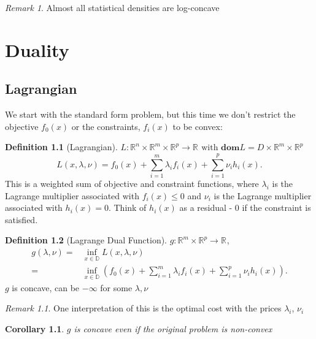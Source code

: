 \documentclass{report}
\newtheorem{corollary}{Corollary}[theorem]
\theoremstyle{remark} \newtheorem{remark}{Remark}[section]
\theoremstyle{definition}
\newtheorem{definition}{Definition}[section]
\theoremstyle{definition}
\theoremstyle{definition}
\theoremstyle{remark}
\begin{document}
\begin{remark}
    Almost all statistical densities are log-concave   
\end{remark}


\chapter{Duality}

\section{Lagrangian}
We start with the standard form problem, but this time we don't restrict the objective $f_0(x)$ or the constraints, $f_i(x)$ to be convex:
\begin{definition}[Lagrangian]
    $L: \mathbb{R}^{n} \times \mathbb{R}^{m} \times \mathbb{R}^{p} \to \mathbb{R}^{} \text{ with } \textbf{dom}L = D \times  \mathbb{R}^m \times \mathbb{R}^{p}$
\[
L(x,\lambda, \nu) = f_0(x) + \sum_{i=1}^{m} \lambda_i f_i(x) + \sum_{i=1}^{p} \nu_i h_i(x)
.\]
This is a weighted sum of objective and constraint functions, where $\lambda_i$ is the Lagrange multiplier associated with $f_i(x)\le 0$ and $\nu_i$ is the Lagrange multiplier associated with $h_i(x)=0$. Think of $h_i(x)$ as a residual - 0 if the constraint is satisfied.
\end{definition}


\begin{definition}[Lagrange Dual Function]
    $g: \mathbb{R}^{m} \times \mathbb{R}^{p} \to \mathbb{R}^{} $,
 \begin{align*}
     g(\lambda, \nu) = & \inf_{x \in \mathbb{D}} L(x,\lambda, \nu) \\
                      = & \inf_{x\in \mathbb{D}}(f_0(x) + \sum_{i=1}^{m} \lambda_i f_i(x) + \sum_{i=1}^{p} \nu_i h_i(x))
 .\end{align*} 
   $g$ is concave, can be $-\infty$ for some $\lambda,\nu$ 
     
\end{definition}

\begin{remark}
    One interpretation of this is the optimal cost with the prices $\lambda_i$, $\nu_i$   
\end{remark}

\begin{corollary}
    $g$ is concave even if the original problem is non-convex   
\end{corollary}
\end{document}
